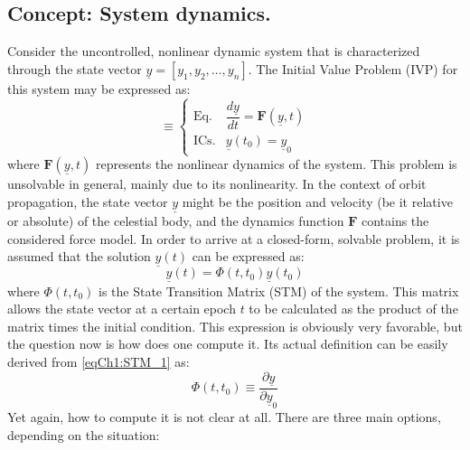 	\subsection{Concept: System dynamics.}
	\indent Consider the uncontrolled, nonlinear dynamic system that is characterized through the state vector $\underline{y} = \left[ y_1, y_2, \ldots, y_n \right]$. The Initial Value Problem (IVP) for this system may be expressed as:
	\begin{equation}
	[P] \equiv \left\{ \begin{array}{lll}
	\text{Eq.}	 	& \dfrac{d \underline{y}}{dt} = \bm F(\underline{y}, t) \\
	\text{ICs.} 	& \underline{y}(t_0) = \underline{y}_0
	\end{array}\right.
	\label{eqCh1:Problem_def}
	\end{equation}
	\noindent where $\bm F(\underline{y}, t)$ represents the nonlinear dynamics of the system. This problem is unsolvable in general, mainly due to its nonlinearity. In the context of orbit propagation, the state vector $\underline{y}$ might be the position and velocity (be it relative or absolute) of the celestial body, and the dynamics function $\bm F$ contains the considered force model. In order to arrive at a closed-form, solvable problem, it is assumed that the solution $\underline{y}(t)$ can be expressed as:
	\begin{equation}
	\underline{y}(t) = \Phi (t, t_0) \underline{y}(t_0)
	\label{eqCh1:STM_1}
	\end{equation}
	\noindent where $\Phi (t, t_0)$ is the State Transition Matrix (STM) of the system. This matrix allows the state vector at a certain epoch $t$ to be calculated as the product of the matrix times the initial condition. This expression is obviously very favorable, but the question now is how does one compute it. Its actual definition can be easily derived from \eqref{eqCh1:STM_1} as:
	\begin{equation}
	\Phi (t, t_0) \equiv \dfrac{\partial \underline{y}}{\partial \underline{y}_0}
	\label{eqCh1:STM_2}
	\end{equation}
	\indent Yet again, how to compute it is not clear at all. There are three main options, depending on the situation:
